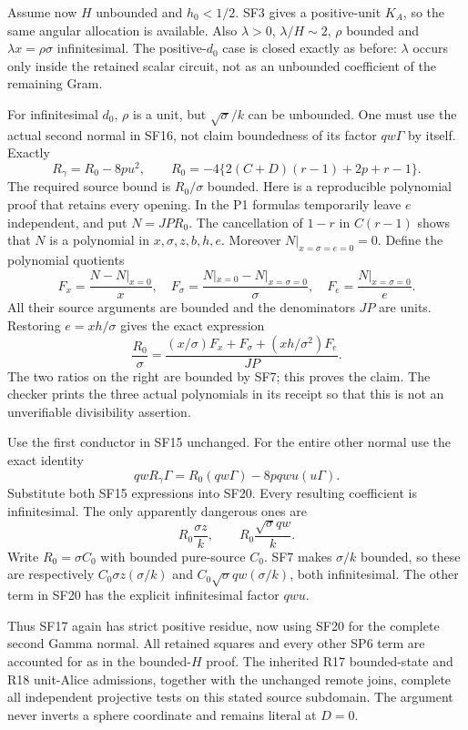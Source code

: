Assume now $H$ unbounded and $h_0<1/2$. SF3 gives a positive-unit
$K_A$, so the same angular allocation is available. Also
$\lambda>0$, $\lambda/H\sim2$, $\rho$ bounded and
$\lambda x=\rho\sigma$ infinitesimal. The positive-$d_0$ case is
closed exactly as before: $\lambda$ occurs only inside the retained
scalar circuit, not as an unbounded coefficient of the remaining Gram.

For infinitesimal $d_0$, $\rho$ is a unit, but $\sqrt\sigma/k$
can be unbounded. One must use the actual second normal in SF16,
not claim boundedness of its factor $qw\Gamma$ by itself. Exactly
\[
 R_\gamma=R_0-8pu^2,\qquad
 R_0=-4\{2(C+D)(r-1)+2p+r-1\}.
 \tag{SF18}
\]
The required source bound is $R_0/\sigma$ bounded. Here is a
reproducible polynomial proof that retains every opening. In the
P1 formulas temporarily leave $e$ independent, and put
$N=JP R_0$. The cancellation of $1-r$ in $C(r-1)$ shows that $N$
is a polynomial in $x,\sigma,z,b,h,e$. Moreover
$N|_{x=\sigma=e=0}=0$. Define the polynomial quotients
\[
 F_x=\frac{N-N|_{x=0}}x,\quad
 F_\sigma=\frac{N|_{x=0}-N|_{x=\sigma=0}}\sigma,\quad
 F_e=\frac{N|_{x=\sigma=0}}e.
\]
All their source arguments are bounded and the denominators $JP$
are units. Restoring $e=xh/\sigma$ gives the exact expression
\[
 \frac{R_0}{\sigma}
 =\frac{(x/\sigma)F_x+F_\sigma+(xh/\sigma^2)F_e}{JP}.
 \tag{SF19}
\]
The two ratios on the right are bounded by SF7; this proves the
claim. The checker prints the three actual polynomials in its receipt
so that this is not an unverifiable divisibility assertion.

Use the first conductor in SF15 unchanged. For the entire other
normal use the exact identity
\[
 qwR_\gamma\Gamma=R_0(qw\Gamma)-8p qwu(u\Gamma).
 \tag{SF20}
\]
Substitute both SF15 expressions into SF20. Every resulting
coefficient is infinitesimal. The only apparently dangerous ones are
\[
 R_0\frac{\sigma z}{k},\qquad
 R_0\frac{\sqrt\sigma qw}{k}.
\]
Write $R_0=\sigma C_0$ with bounded pure-source $C_0$. SF7 makes
$\sigma/k$ bounded, so these are respectively
$C_0\sigma z(\sigma/k)$ and
$C_0\sqrt\sigma qw(\sigma/k)$, both infinitesimal. The other
term in SF20 has the explicit infinitesimal factor $qwu$.

Thus SF17 again has strict positive residue, now using SF20 for the
complete second Gamma normal. All retained squares and every other
SP6 term are accounted for as in the bounded-$H$ proof. The inherited
R17 bounded-state and R18 unit-Alice admissions, together with the
unchanged remote joins, complete all independent projective tests on
this stated source subdomain. The argument never inverts a sphere
coordinate and remains literal at $D=0$.

